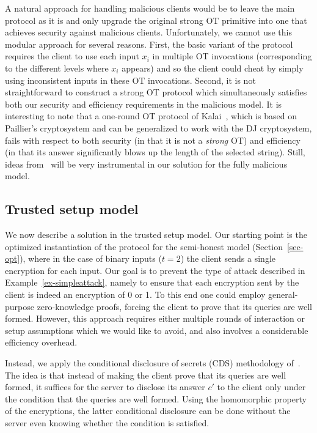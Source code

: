 \documentclass{article}
\begin{document}
A natural approach for handling malicious clients would be to leave
the main protocol as it is and only upgrade the original strong OT
primitive into one that achieves security against malicious clients.
Unfortunately, we cannot use this modular approach for several
reasons. First, the basic variant of the protocol requires the client
to use each input $x_i$ in multiple OT invocations (corresponding to
the different levels where $x_i$ appears) and so the client could
cheat by simply using inconsistent inputs in these OT invocations.
Second, it is not straightforward to construct a strong OT protocol
which simultaneously satisfies both our security and efficiency
requirements in the malicious model. It is interesting to note that
a one-round OT protocol of Kalai~\cite{T05}, which is based on
Paillier's cryptosystem and can be generalized to work with the DJ
cryptosystem, fails with respect to both security (in that it is
not a {\em strong} OT) and efficiency (in that its answer
significantly blows up the length of the selected string). Still,
ideas from~\cite{T05} will be very instrumental in our solution for
the fully malicious model.



\subsection{Trusted setup model}
\label{sec-trusted}

We now describe a solution in the trusted setup model. Our starting
point is the optimized instantiation of the protocol for the
semi-honest model (Section~\ref{sec-opt}), where in the case of
binary inputs ($t=2$) the client sends a single encryption for each
input. Our goal is to prevent the type of attack described in
Example~\ref{ex-simpleattack}, namely to ensure that each
encryption sent by the client is indeed an encryption of 0 or 1. To
this end one could employ general-purpose zero-knowledge proofs,
forcing the client to prove that its queries are well formed.
However, this approach requires either multiple rounds of
interaction or setup assumptions which we would like to avoid, and
also involves a considerable efficiency overhead.

Instead, we apply the conditional disclosure of secrets (CDS)
methodology of~\cite{GIKM,AIR01}. The idea is that instead of
making the client prove that its queries are well formed, it
suffices for the server to disclose its answer $c'$ to the client
only under the condition that the queries are well formed. Using
the homomorphic property of the encryptions, the latter conditional
disclosure can be done without the server even knowing whether the
condition is satisfied.
\end{document}
